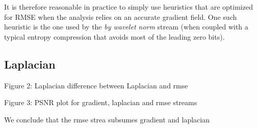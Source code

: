 It is therefore reasonable in practice to simply use heuristics that are optimized for RMSE when the
analysis relies on an accurate gradient field. One such heuristic is the one used by the \emph{by
wavelet norm} stream (when coupled with a typical entropy compression that avoids most of the
leading zero bits).

\subsection{Laplacian}

Figure 2: Laplacian difference between Laplacian and rmse

Figure 3: PSNR plot for gradient, laplacian and rmse streams

We conclude that the rmse strea subsumes gradient and laplacian
